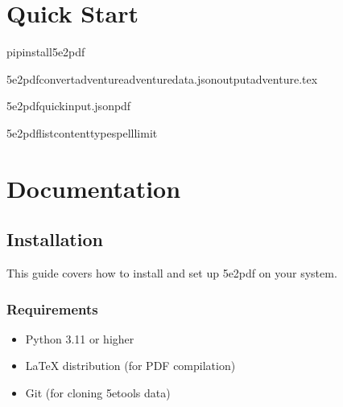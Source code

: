 \documentclass[letterpaper,10pt,english]{sphinxmanual}
\begin{document}
\chapter{Quick Start}
\label{\detokenize{index:quick-start}}
\begin{sphinxVerbatim}[commandchars=\\\{\}]
pipinstall5e2pdf

5e2pdfconvertadventureadventure\PYGZhy{}data.json\PYGZhy{}\PYGZhy{}outputadventure.tex

5e2pdfquickinput.json\PYGZhy{}\PYGZhy{}pdf

5e2pdflistcontent\PYGZhy{}\PYGZhy{}typespell\PYGZhy{}\PYGZhy{}limit
\end{sphinxVerbatim}


\chapter{Documentation}
\label{\detokenize{index:documentation}}
\sphinxstepscope


\section{Installation}
\label{\detokenize{user-guide/installation:installation}}\label{\detokenize{user-guide/installation::doc}}
\sphinxAtStartPar
This guide covers how to install and set up 5e2pdf on your system.


\subsection{Requirements}
\label{\detokenize{user-guide/installation:requirements}}\begin{itemize}
\item {} 
\sphinxAtStartPar
Python 3.11 or higher

\item {} 
\sphinxAtStartPar
LaTeX distribution (for PDF compilation)

\item {} 
\sphinxAtStartPar
Git (for cloning 5etools data)

\end{itemize}
\end{document}
